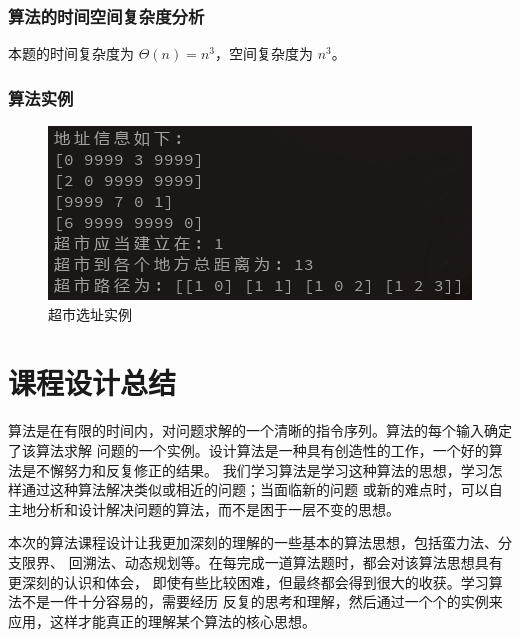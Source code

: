 \documentclass{ctexart}
\begin{document}
\subsubsection{算法的时间空间复杂度分析 }
本题的时间复杂度为 $\Theta(n) = n^3$，空间复杂度为 $n^3$。
\subsubsection{算法实例}
\begin{figure}[H]
	\centering
	\includegraphics[scale=0.6]{../images/find_shortest_path.png}
	\caption{超市选址实例}
\end{figure}

\newpage
\section{课程设计总结}
算法是在有限的时间内，对问题求解的一个清晰的指令序列。算法的每个输入确定了该算法求解
问题的一个实例。设计算法是一种具有创造性的工作，一个好的算法是不懈努力和反复修正的结果。
我们学习算法是学习这种算法的思想，学习怎样通过这种算法解决类似或相近的问题；当面临新的问题
或新的难点时，可以自主地分析和设计解决问题的算法，而不是困于一层不变的思想。

本次的算法课程设计让我更加深刻的理解的一些基本的算法思想，包括蛮力法、分支限界、
回溯法、动态规划等。在每完成一道算法题时，都会对该算法思想具有更深刻的认识和体会，
即使有些比较困难，但最终都会得到很大的收获。学习算法不是一件十分容易的，需要经历
反复的思考和理解，然后通过一个个的实例来应用，这样才能真正的理解某个算法的核心思想。
\end{document}
